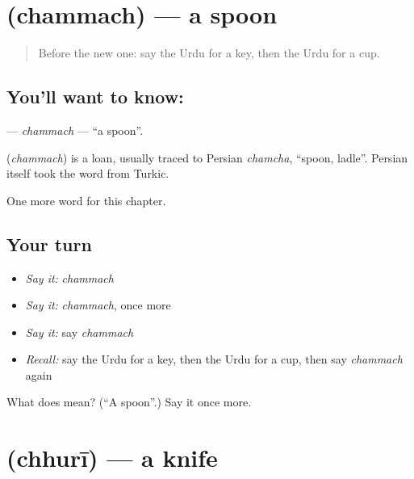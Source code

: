 \section[\texorpdfstring{\ur{چمچ} (chammach)}{چمچ (chammach)}]{ (chammach) — a spoon}

\label{lesson:UR-C60-chammach}



\begin{quote}
Before the new one: say the Urdu for a key, then the Urdu for a cup.
\end{quote}

\subsection*{You'll want to know: }
\textbf{} — \emph{chammach} — \textquotedblleft{}a spoon\textquotedblright{}.

\begin{cousinweb}
\textbf{} (\emph{chammach}) is a loan, usually traced to Persian \emph{chamcha}, \textquotedblleft{}spoon, ladle\textquotedblright{}. Persian itself took the word from Turkic.
\end{cousinweb}

\begin{grammarlens}[title={What you've built}]
One more word for this chapter.
\end{grammarlens}

\subsection*{Your turn}
\begin{itemize}
\raggedright
  \item \emph{Say it:} \emph{chammach}
  \item \emph{Say it:} \emph{chammach}, once more
  \item \emph{Say it:} say \emph{chammach}
  \item \emph{Recall:} say the Urdu for a key, then the Urdu for a cup, then say \emph{chammach} again
\end{itemize}

\begin{tcolorbox}[breakable,colback=teal!4,colframe=teal!35!black,title={Before you move on}]
What does  mean? (\textquotedblleft{}A spoon\textquotedblright{}.) Say it once more.
\end{tcolorbox}
\section[\texorpdfstring{\ur{چھری} (chhurī)}{چھری (chhurī)}]{ (chhurī) — a knife}


